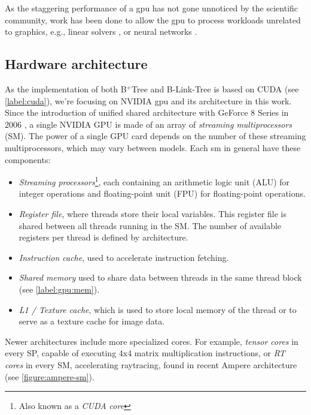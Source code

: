 As the staggering performance of a \acrshort{gpu} has not gone unnoticed by the scientific community, work has been done to allow the \acrshort{gpu} to process workloads unrelated to graphics, e.g., linear solvers \cite{cusolver}, or neural networks \cite{cudnn}.

\subsection{Hardware architecture}

As the implementation of both B$^+$Tree and B-Link-Tree is based on CUDA (see \cref{label:cuda}), we're focusing on NVIDIA \acrshort{gpu} and its architecture in this work. Since the introduction of unified shared architecture with GeForce 8 Series in 2006 \cite{cuda-g80}, a single NVIDIA GPU is made of an array of \textit{streaming multiprocessors} (SM). The power of a single GPU card depends on the number of these streaming multiprocessors, which may vary between models. Each \acrshort{sm} in general have these components:
\begin{itemize}
  \item \textit{Streaming processors}\footnote{Also known as a \textit{CUDA core}}, each containing an arithmetic logic unit (ALU) for integer operations and floating-point unit (FPU) for floating-point operations.
  \item \textit{Register file}, where threads store their local variables. This register file is shared between all threads running in the SM. The number of available registers per thread is defined by architecture.
  \item \textit{Instruction cache}, used to accelerate instruction fetching.
  \item \textit{Shared memory} used to share data between threads in the same thread block (see \cref{label:gpu:mem}).
  \item \textit{L1 / Texture cache}, which is used to store local memory of the thread or to serve as a texture cache for image data.
\end{itemize}

Newer architectures include more specialized cores. For example, \textit{tensor cores} in every SP, capable of executing 4x4 matrix multiplication instructions, or \textit{RT cores} in every SM, accelerating raytracing, found in recent Ampere architecture (see \cref{figure:ampere-sm}).

